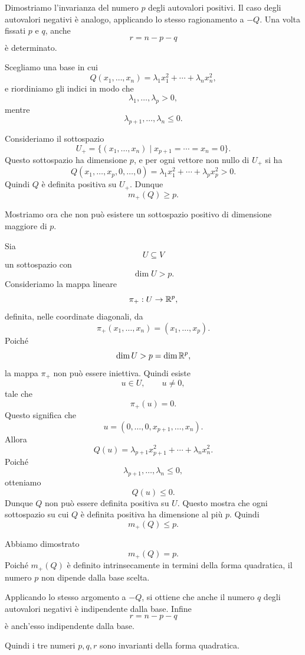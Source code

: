 \documentclass[a4paper]{article}
\begin{document}
\begin{snippetproof}{}
    Dimostriamo l'invarianza del numero \(p\) degli autovalori positivi. Il caso degli autovalori negativi è analogo, applicando lo stesso ragionamento a \(-Q\). Una volta fissati \(p\) e \(q\), anche
    \[
        r=n-p-q
    \]
    è determinato.

    Scegliamo una base in cui
    \[
        Q(x_1,\ldots,x_n)
        =
        \lambda_1x_1^2+\cdots+\lambda_nx_n^2,
    \]
    e riordiniamo gli indici in modo che
    \[
        \lambda_1,\ldots,\lambda_p>0,
    \]
    mentre
    \[
        \lambda_{p+1},\ldots,\lambda_n\leq 0.
    \]

    Consideriamo il sottospazio
    \[
        U_+
        =
        \{(x_1,\ldots,x_n)\mid x_{p+1}=\cdots=x_n=0\}.
    \]
    Questo sottospazio ha dimensione \(p\), e per ogni vettore non nullo di \(U_+\) si ha
    \[
        Q(x_1,\ldots,x_p,0,\ldots,0)
        =
        \lambda_1x_1^2+\cdots+\lambda_px_p^2
        >
        0.
    \]
    Quindi \(Q\) è definita positiva su \(U_+\). Dunque
    \[
        m_+(Q)\geq p.
    \]

    Mostriamo ora che non può esistere un sottospazio positivo di dimensione maggiore di \(p\).

    Sia
    \[
        U\subseteq V
    \]
    un sottospazio con
    \[
        \dim U>p.
    \]
    Consideriamo la mappa lineare
    \[
        \pi_+:U\to\mathbb{R}^p,
    \]
    definita, nelle coordinate diagonali, da
    \[
        \pi_+(x_1,\ldots,x_n)=(x_1,\ldots,x_p).
    \]
    Poiché
    \[
        \dim U>p=\dim\mathbb{R}^p,
    \]
    la mappa \(\pi_+\) non può essere iniettiva. Quindi esiste
    \[
        u\in U,
        \qquad
        u\neq 0,
    \]
    tale che
    \[
        \pi_+(u)=0.
    \]
    Questo significa che
    \[
        u=(0,\ldots,0,x_{p+1},\ldots,x_n).
    \]
    Allora
    \[
        Q(u)
        =
        \lambda_{p+1}x_{p+1}^2+\cdots+\lambda_nx_n^2.
    \]
    Poiché
    \[
        \lambda_{p+1},\ldots,\lambda_n\leq 0,
    \]
    otteniamo
    \[
        Q(u)\leq 0.
    \]
    Dunque \(Q\) non può essere definita positiva su \(U\). Questo mostra che ogni sottospazio su cui \(Q\) è definita positiva ha dimensione al più \(p\). Quindi
    \[
        m_+(Q)\leq p.
    \]

    Abbiamo dimostrato
    \[
        m_+(Q)=p.
    \]
    Poiché \(m_+(Q)\) è definito intrinsecamente in termini della forma quadratica, il numero \(p\) non dipende dalla base scelta.

    Applicando lo stesso argomento a \(-Q\), si ottiene che anche il numero \(q\) degli autovalori negativi è indipendente dalla base. Infine
    \[
        r=n-p-q
    \]
    è anch'esso indipendente dalla base.

    Quindi i tre numeri \(p,q,r\) sono invarianti della forma quadratica.
\end{snippetproof}
\end{document}
